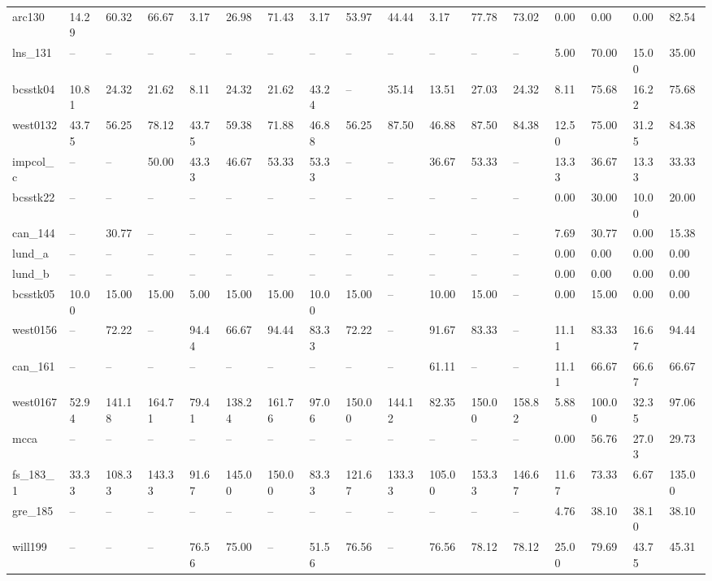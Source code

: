\begin{tabular}{lllllllllllllllll}
arc130 & 14.29 & 60.32 & 66.67 & 3.17 & 26.98 & 71.43 & 3.17 & 53.97 & 44.44 & 3.17 & 77.78 & 73.02 & 0.00 & 0.00 & 0.00 & 82.54 \\
lns\_131 & -- & -- & -- & -- & -- & -- & -- & -- & -- & -- & -- & -- & 5.00 & 70.00 & 15.00 & 35.00 \\
bcsstk04 & 10.81 & 24.32 & 21.62 & 8.11 & 24.32 & 21.62 & 43.24 & -- & 35.14 & 13.51 & 27.03 & 24.32 & 8.11 & 75.68 & 16.22 & 75.68 \\
west0132 & 43.75 & 56.25 & 78.12 & 43.75 & 59.38 & 71.88 & 46.88 & 56.25 & 87.50 & 46.88 & 87.50 & 84.38 & 12.50 & 75.00 & 31.25 & 84.38 \\
impcol\_c & -- & -- & 50.00 & 43.33 & 46.67 & 53.33 & 53.33 & -- & -- & 36.67 & 53.33 & -- & 13.33 & 36.67 & 13.33 & 33.33 \\
bcsstk22 & -- & -- & -- & -- & -- & -- & -- & -- & -- & -- & -- & -- & 0.00 & 30.00 & 10.00 & 20.00 \\
can\_144 & -- & 30.77 & -- & -- & -- & -- & -- & -- & -- & -- & -- & -- & 7.69 & 30.77 & 0.00 & 15.38 \\
lund\_a & -- & -- & -- & -- & -- & -- & -- & -- & -- & -- & -- & -- & 0.00 & 0.00 & 0.00 & 0.00 \\
lund\_b & -- & -- & -- & -- & -- & -- & -- & -- & -- & -- & -- & -- & 0.00 & 0.00 & 0.00 & 0.00 \\
bcsstk05 & 10.00 & 15.00 & 15.00 & 5.00 & 15.00 & 15.00 & 10.00 & 15.00 & -- & 10.00 & 15.00 & -- & 0.00 & 15.00 & 0.00 & 0.00 \\
west0156 & -- & 72.22 & -- & 94.44 & 66.67 & 94.44 & 83.33 & 72.22 & -- & 91.67 & 83.33 & -- & 11.11 & 83.33 & 16.67 & 94.44 \\
can\_161 & -- & -- & -- & -- & -- & -- & -- & -- & -- & 61.11 & -- & -- & 11.11 & 66.67 & 66.67 & 66.67 \\
west0167 & 52.94 & 141.18 & 164.71 & 79.41 & 138.24 & 161.76 & 97.06 & 150.00 & 144.12 & 82.35 & 150.00 & 158.82 & 5.88 & 100.00 & 32.35 & 97.06 \\
mcca & -- & -- & -- & -- & -- & -- & -- & -- & -- & -- & -- & -- & 0.00 & 56.76 & 27.03 & 29.73 \\
fs\_183\_1 & 33.33 & 108.33 & 143.33 & 91.67 & 145.00 & 150.00 & 83.33 & 121.67 & 133.33 & 105.00 & 153.33 & 146.67 & 11.67 & 73.33 & 6.67 & 135.00 \\
gre\_185 & -- & -- & -- & -- & -- & -- & -- & -- & -- & -- & -- & -- & 4.76 & 38.10 & 38.10 & 38.10 \\
will199 & -- & -- & -- & 76.56 & 75.00 & -- & 51.56 & 76.56 & -- & 76.56 & 78.12 & 78.12 & 25.00 & 79.69 & 43.75 & 45.31 \\

\end{tabular}
